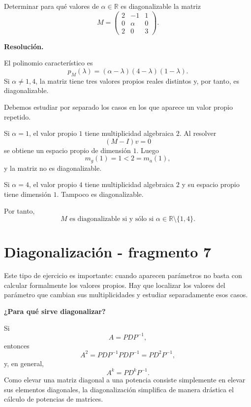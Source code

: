 \begin{solvedexercise}
Determinar para qué valores de $\alpha\in\mathbb{R}$ es diagonalizable la matriz
\[
M=\begin{pmatrix}
2&-1&1\\
0&\alpha&0\\
2&0&3
\end{pmatrix}.
\]

\textbf{Resolución.}\par\smallskip
El polinomio característico es
\[
p_M(\lambda)=(\alpha-\lambda)(4-\lambda)(1-\lambda).
\]
Si $\alpha\neq1,4$, la matriz tiene tres valores propios reales distintos y, por tanto, es diagonalizable.

Debemos estudiar por separado los casos en los que aparece un valor propio repetido.

Si $\alpha=1$, el valor propio $1$ tiene multiplicidad algebraica $2$. Al resolver
\[
(M-I)v=0
\]
se obtiene un espacio propio de dimensión $1$. Luego
\[
m_g(1)=1<2=m_a(1),
\]
y la matriz no es diagonalizable.

Si $\alpha=4$, el valor propio $4$ tiene multiplicidad algebraica $2$ y su espacio propio tiene dimensión $1$. Tampoco es diagonalizable.

Por tanto,
\[
\boxed{M\text{ es diagonalizable si y sólo si }\alpha\in\mathbb{R}\setminus\{1,4\}.}
\]
\end{solvedexercise}


\section{Diagonalización - fragmento 7}
Este tipo de ejercicio es importante: cuando aparecen parámetros no basta con calcular formalmente los valores propios. Hay que localizar los valores del parámetro que cambian sus multiplicidades y estudiar separadamente esos casos.

\textbf{¿Para qué sirve diagonalizar?}

Si
\[
A=PDP^{-1},
\]
entonces
\[
A^2=PDP^{-1}PDP^{-1}=PD^2P^{-1},
\]
y, en general,
\[
\boxed{A^k=PD^kP^{-1}.}
\]
Como elevar una matriz diagonal a una potencia consiste simplemente en elevar sus elementos diagonales, la diagonalización simplifica de manera drástica el cálculo de potencias de matrices.

